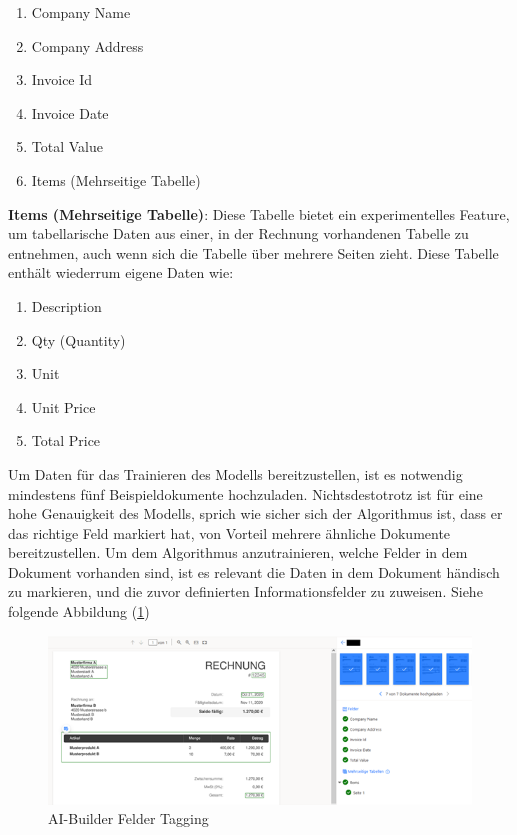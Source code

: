 \begin{enumerate}
    \item Company Name
    \item Company Address
    \item Invoice Id
    \item Invoice Date
    \item Total Value
    \item Items (Mehrseitige Tabelle)
\end{enumerate}

\textbf{Items (Mehrseitige Tabelle)}: Diese Tabelle bietet ein experimentelles Feature, um tabellarische Daten aus einer, in der Rechnung vorhandenen Tabelle zu entnehmen, auch wenn sich die Tabelle über mehrere Seiten zieht. Diese Tabelle enthält wiederrum eigene Daten wie:

\label{enum:InvoiceItemsAttributs}
\begin{enumerate}
    \item Description
    \item Qty (Quantity)
    \item Unit
    \item Unit Price
    \item Total Price
\end{enumerate}


Um Daten für das Trainieren des Modells bereitzustellen, ist es notwendig mindestens fünf Beispieldokumente hochzuladen. Nichtsdestotrotz ist für eine hohe Genauigkeit des Modells, sprich wie sicher sich der Algorithmus ist, dass er das richtige Feld markiert hat, von Vorteil mehrere ähnliche Dokumente bereitzustellen.
Um dem Algorithmus anzutrainieren, welche Felder in dem Dokument vorhanden sind, ist es relevant die Daten in dem Dokument händisch zu markieren, und die zuvor definierten Informationsfelder zu zuweisen. Siehe folgende Abbildung (\ref{fig:ai-builder-tagging-figure})

\begin{figure}[h]
    \centering
    \includegraphics[scale=0.9]{sections/cloud-computing/images/ai-builder-tagging.png}
    \caption{AI-Builder Felder Tagging}
    \label{fig:ai-builder-tagging-figure}
\end{figure}